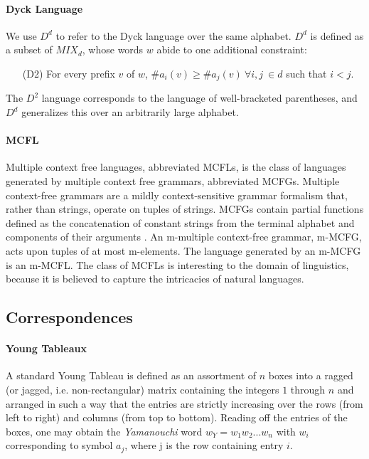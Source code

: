 \documentclass[nonatbib,numbers,10pt]{llncs}
\begin{document}
\paragraph{Dyck Language}
We use $D^d$ to refer to the Dyck language over the same alphabet. $D^d$ is defined as a subset of $MIX_d$, whose words $w$ abide to one additional constraint:
\begin{itemize}
\item[(D2)] For every prefix $v$ of $w$, $ \#a_i(v) \geq \#a_j(v) \ \forall i, j \ \in d$ such that $i < j$.
\end{itemize}

The $D^2$ language corresponds to the language of well-bracketed parentheses, and $D^d$ generalizes this over an arbitrarily large alphabet.
\paragraph{MCFL}
Multiple context free languages, abbreviated MCFLs, is the class of languages generated by multiple context free grammars, abbreviated MCFGs. Multiple context-free grammars are a mildly context-sensitive grammar formalism that, rather than strings, operate on tuples of strings. MCFGs contain partial functions defined as the concatenation of constant strings from the terminal alphabet and components of their arguments \cite{gotzmann}. An m-multiple context-free grammar, m-MCFG, acts upon tuples of at most m-elements. The language generated by an m-MCFG is an m-MCFL. The class of MCFLs is interesting to the domain of linguistics, because it is believed to capture the intricacies of natural languages.

\subsection{Correspondences}
%
\paragraph{Young Tableaux}
A standard Young Tableau is defined as an assortment of $n$ boxes into a ragged (or jagged, i.e. non-rectangular) matrix containing the integers $1$ through $n$ and arranged in such a way that the entries are strictly increasing over the rows (from left to right) and columns (from top to bottom). Reading off the entries of the boxes, one may obtain the \textit{Yamanouchi} word $w_Y =w_1 w_2 ... w_n$ with $w_i$ corresponding to symbol $a_j$, where j is the row containing entry $i$.
\end{document}
